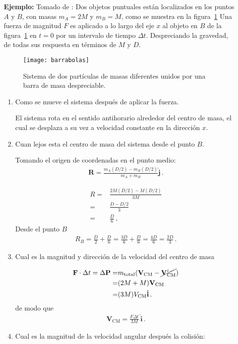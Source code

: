 \begin{itemize}
\item[\textbf{Ejemplo:}] Tomado de \cite{mit2009}: Dos objetos puntuales están localizados en los puntos $A$ y $B$, con masas $m_A=2M$ y $m_B=M$, como se muestra en la figura~\ref{fig:barrabolas} Una fuerza de magnitud $F$ es aplicado a lo largo del eje $x$ al objeto en $B$ de la figura~\ref{fig:barrabolas} en $t=0$ por un intervalo de tiempo $\Delta t$. Despreciando la gravedad, de todas sus respuesta en términos de $M$ y $D$.
  \begin{figure}
    \centering
    \texttt{[image: barrabolas]}
    \caption{Sistema de dos partículas de masas diferentes unidos por una barra de masa despreciable.}
    \label{fig:barrabolas}
  \end{figure}

  \begin{enumerate}
  \item Como se mueve el sistema después de aplicar la fuerza.

El sistema rota en el sentido antihorario alrededor del centro de masa, el cual se desplaza a su vez a velocidad constante en la dirección $x$.
\item Cuan lejos esta el centro de masa del sistema desde el punto $B$.

Tomando el origen de coordenadas en el punto medio:
\begin{align}
\mathbf{R}=\frac{m_A(D/2)-m_B(D/2)}{m_A+m_B}\hat{\mathbf{j}}\,.  
\end{align}

\begin{align}
R=&\frac{2M(D/2)-M(D/2)}{3M}\nonumber\\
=&\frac{D-D/2}{3}\nonumber\\
=&\frac{D}{6}\,,
\end{align}
Desde el punto $B$
\begin{align}
  R_B=\frac{D}{2}+\frac{D}{6}=\frac{3D}{6}+\frac{D}{6}=\frac{4D}{6}=\frac{2D}{3}\,.
\end{align}
\item Cual es la magnitud y dirección de la velocidad del centro de masa

  \begin{align}
    \mathbf{F}\cdot \Delta t=\Delta \mathbf{P}=&m_{\text{total}}(\mathbf{V}_{\text{CM}}-\cancel{\mathbf{V}_{\text{CM}}^i})\nonumber\\
    =&(2M+M)\mathbf{V}_{\text{CM}}\nonumber\\
    =&(3M)V_{\text{CM}}\hat{\mathbf{i}}\,.
  \end{align}
de modo que
\begin{align}
  \label{eq:6}
  \mathbf{V}_{\text{CM}}=\frac{F\Delta t}{3M}\,\hat{\mathbf{i}}\,.
\end{align}
\item Cual es la magnitud de la velocidad angular después la colisión:


\end{enumerate}
\end{itemize}
